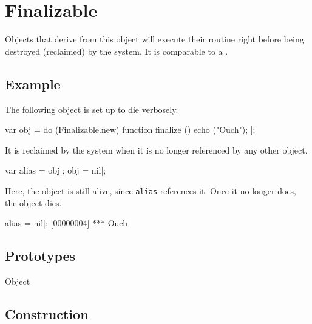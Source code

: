 
\section{Finalizable}

Objects that derive from this object will execute their 
routine right before being destroyed (reclaimed) by the system.  It is
comparable to a .

\subsection{Example}

The following object is set up to die verbosely.

\begin{urbiscript}
var obj =
  do (Finalizable.new)
  {
    function finalize ()
    {
      echo ("Ouch");
    }
  }|;
\end{urbiscript}

\noindent
It is reclaimed by the system when it is no longer referenced by any
other object.

\begin{urbiscript}
var alias = obj|;
obj = nil|;
\end{urbiscript}

\noindent
Here, the object is still alive, since \lstinline|alias| references
it.   Once it no longer does, the object dies.

\begin{urbiscript}
alias = nil|;
[00000004] *** Ouch
\end{urbiscript}

\subsection{Prototypes}

\begin{refObjects}
\item[Object]
\end{refObjects}

\subsection{Construction}

